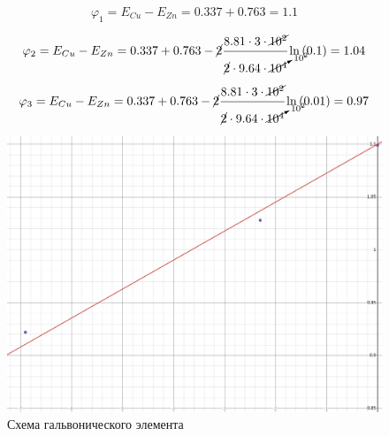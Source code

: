 \begin{equation}
  \varphi_1 = E_{Cu} - E_{Zn} = 0.337 + 0.763 = 1.1
\end{equation}

\begin{equation}
  \varphi_2 = E_{Cu} - E_{Zn} = 0.337 + 0.763 - \cancel{2}\cfrac{ 8.81 \cdot 3 \cdot \cancel{10^2}}{\cancel{2}\cdot9.64\cdot \cancelto{10^2}{10^4}}\ln\left( 0.1 \right) = 1.04
\end{equation}

\begin{equation}
  \varphi_3 = E_{Cu} - E_{Zn} = 0.337 + 0.763 - \cancel{2}\cfrac{ 8.81 \cdot 3 \cdot \cancel{10^2}}{\cancel{2}\cdot9.64\cdot \cancelto{10^2}{10^4}}\ln\left( 0.01 \right) = 0.97
\end{equation}

\begin{figure}[h]
  \centering
  \includegraphics[width=1\linewidth]{Ex_1/plot.png}
   \caption{Схема гальвонического элемента}
  \label{ex_1_2}
\end{figure}






